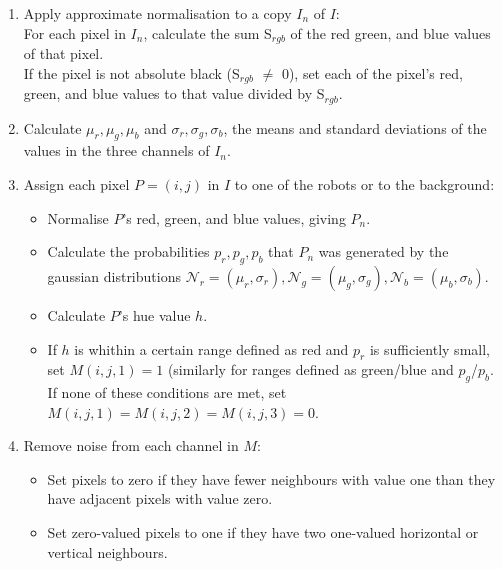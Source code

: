 \documentclass[10pt,a4paper,twocolumn]{article}
\begin{document}
\begin{enumerate}
    \item
    Apply approximate normalisation to a copy $I_n$ of $I$:\\
    For each pixel in $I_n$, calculate the sum S$_{rgb}$ of the 
    red green, and blue values of that pixel.\\
    If the pixel is not absolute black (S$_{rgb}$ $\ne$ 0), set each of the 
    pixel's red, green, and blue values to that value divided by S$_{rgb}$.

    \item
    Calculate $\mu_r, \mu_g, \mu_b$ and $\sigma_r, \sigma_g, \sigma_b$, the 
    means and standard deviations of the values in the three channels of $I_n$.

    \item
    Assign each pixel $P = (i,j)$ in $I$ to one of the robots or to the 
    background:
    \begin{itemize}
        \item
        Normalise $P$'s red, green, and blue values, giving $P_n$.
        \item
        Calculate the probabilities $p_r, p_g, p_b$ that $P_n$ was generated 
        by the gaussian distributions $\mathcal{N}_r = (\mu_r, \sigma_r),
        \mathcal{N}_g = (\mu_g, \sigma_g), \mathcal{N}_b = (\mu_b, \sigma_b)$.
        \item
        Calculate $P$'s hue value $h$.
        \item
        If $h$ is whithin a certain range defined as red and $p_r$ is
        sufficiently small, set $M(i,j,1) = 1$ (similarly for ranges defined as
        green/blue and $p_g$/$p_b$. If none of these conditions are met, set
        $M(i,j,1) = M(i,j,2) = M(i,j,3) = 0$.
    \end{itemize}

    \item
    Remove noise from each channel in $M$:
    \begin{itemize}
        \item
        Set pixels to zero if they have fewer neighbours with value one than
        they have adjacent pixels with value zero.
        \item
        Set zero-valued pixels to one if they have two one-valued 
        horizontal or vertical neighbours.
    \end{itemize}


\end{enumerate}
\end{document}
